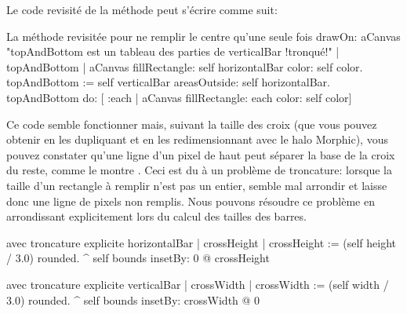 \documentclass[a4paper,10pt,twoside]{book}
\begin{document}
Le code revisit\'e de la m\'ethode  peut s'\'ecrire comme suit:

\begin{method}{La m\'ethode  revisit\'ee pour ne remplir le centre qu'une seule fois}
drawOn: aCanvas 
    "topAndBottom est un tableau des parties de verticalBar !tronqu\'e!"
	| topAndBottom |
	aCanvas fillRectangle: self horizontalBar color: self color.
	topAndBottom := self verticalBar areasOutside: self horizontalBar. 
	topAndBottom do: [ :each | aCanvas fillRectangle: each color: self color]
\end{method}

Ce code semble fonctionner mais, suivant la taille des croix 
(que vous pouvez obtenir en les dupliquant et en les redimensionnant
avec le halo Morphic), vous pouvez constater qu'une ligne d'un pixel
de haut peut s\'eparer la base de la croix du reste, comme le montre
.
Ceci est du \`a un probl\`eme de troncature: %
lorsque la taille d'un rectangle \`a remplir n'est pas un entier,
 semble mal arrondir et laisse donc une
ligne de pixels non remplis.
Nous pouvons r\'esoudre ce probl\`eme en arrondissant explicitement
lors du calcul des tailles des barres.

\begin{method}{ avec troncature explicite}
horizontalBar
	| crossHeight |
	crossHeight := (self height / 3.0) rounded.
	^ self bounds insetBy: 0 @ crossHeight
\end{method}

\begin{method}{ avec troncature explicite}
verticalBar
	| crossWidth |
	crossWidth := (self width / 3.0) rounded.
	^ self bounds insetBy: crossWidth @ 0
\end{method}





\end{document}
